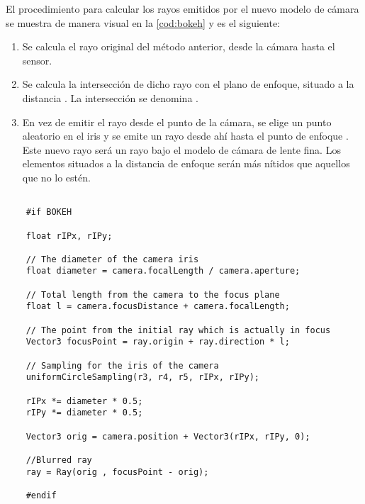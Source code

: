 El procedimiento para calcular los rayos emitidos por el nuevo modelo de cámara se muestra de manera visual en la \autoref{cod:bokeh} y es el siguiente:

\begin{enumerate}
		
\item Se calcula el rayo original del método anterior, desde la cámara hasta el sensor.

\item Se calcula la intersección de dicho rayo con el plano de enfoque, situado a la distancia . La intersección se denomina .
	
\item En vez de emitir el rayo desde el punto de la cámara, se elige un punto aleatorio en el iris  y se emite un rayo desde ahí hasta el punto de enfoque . Este nuevo rayo será un rayo bajo el modelo de cámara de lente fina. Los elementos situados a la distancia de enfoque  serán más nítidos que aquellos que no lo estén.
	
\end{enumerate}

\begin{minipage}[c]{0.95\textwidth}
\begin{lstlisting}[label={cod:bokeh}, caption={Código de desenfoque.}]
	
	#if BOKEH
	
    float rIPx, rIPy;

    // The diameter of the camera iris
    float diameter = camera.focalLength / camera.aperture;

    // Total length from the camera to the focus plane
    float l = camera.focusDistance + camera.focalLength;

    // The point from the initial ray which is actually in focus
    Vector3 focusPoint = ray.origin + ray.direction * l;

    // Sampling for the iris of the camera
    uniformCircleSampling(r3, r4, r5, rIPx, rIPy);

    rIPx *= diameter * 0.5;
    rIPy *= diameter * 0.5;

    Vector3 orig = camera.position + Vector3(rIPx, rIPy, 0);

    //Blurred ray
    ray = Ray(orig , focusPoint - orig);

	#endif 

\end{lstlisting}
\end{minipage}

